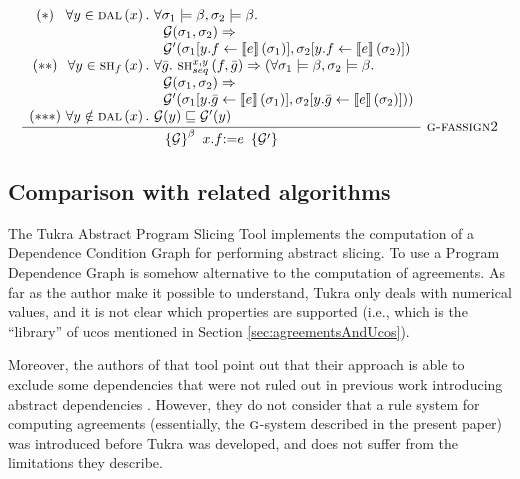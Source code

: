 \documentclass[prodmode,acmtocl]{acmsmall}
\def\state{\ensuremath{\sigma}\xspace}
\newcommand{\0}{\mbox{\bf 0}}
\newcommand{\CODE}[1]{\ensuremath{\mbox{\lstinline!#1!}\xspace}\xspace}
\newcommand{\SEMANTICS}[1]{\left\llbracket #1 \right\rrbracket}
\def\PRED{\beta}
\def\AGREEM{\mathcal{G}}
\newcommand{\RULENAME}[1]{\textsc{#1}}
\newcommand{\GRULENAME}[1]{\textsc{g-#1}}
\newcommand{\GRULE}[3]{\frac{#1}{#2}\ \GRULENAME{#3}}
\newcommand{\GSMTH}[1]{$\RULENAME{g}$-#1}
\def\GSYSTEM{\GSMTH{system}\xspace}
\newcommand{\SEQSHARE}[4]{\textsc{sh}_{seq}^{#3,#4}\left(#1,#2\right)}
\newcommand{\TRIPLEB}[4]{\left\{#1\right\}^{#2}\ #3\ \left\{#4\right\}}
\newcommand{\DALIAS}[1]{\textsc{dal}\left(#1\right)}
\newcommand{\FSHARE}[2]{\textsc{sh}_{#1}\left(#2\right)}
\begin{document}
\[
\GRULE{
  \begin{array}{c@{~}r@{~}l}
    ({*}) & \forall y \in \DALIAS{x}. & \forall
    \state_1 \models \PRED,\state_2 \models
    \PRED. \\ 
    & & ~~\AGREEM(\state_1,\state_2)
    \Rightarrow \\
    & & ~~\AGREEM'(\state_1[y.f \leftarrow
      \SEMANTICS{e}(\state_1)],\state_2[y.f \leftarrow
      \SEMANTICS{e}(\state_2)]) \\
    ({*}{*}) & \forall y \in \FSHARE{f}{x}. &
    \forall \bar{g}.~\SEQSHARE{f}{\bar{g}}{x}{y} \Rightarrow
    (\forall
    \state_1 \models \PRED,\state_2 \models
    \PRED. \\
    & & ~~\AGREEM(\state_1,\state_2)
    \Rightarrow \\
    & & ~~\AGREEM'(\state_1[y.\bar{g} \leftarrow
      \SEMANTICS{e}(\state_1)],\state_2[y.\bar{g} \leftarrow
      \SEMANTICS{e}(\state_2)])) \\
    ({*}{*}{*}) & \forall y \notin \DALIAS{x}. & \AGREEM(y)
    \sqsubseteq \AGREEM'(y)
  \end{array}
}{
  \TRIPLEB{\AGREEM}{\PRED}{x.f\mbox{\CODE{:=}}e}{\AGREEM'}
}{fassign2}
\]

\subsection{Comparison with related algorithms}
\label{sec:comparisonWithRelatedAlgorithms}

The Tukra Abstract Program Slicing Tool
\cite{DBLP:conf/icsoft/HalderC12} implements the computation of a
Dependence Condition Graph \cite{DBLP:journals/scp/HalderC13} for
performing abstract slicing.  To use a Program Dependence Graph is
somehow alternative to the computation of agreements.  As far as the
author make it possible to understand, Tukra only deals with numerical
values, and it is not clear which properties are supported (i.e.,
which is the ``library'' of ucos mentioned in Section
\ref{sec:agreementsAndUcos}).

Moreover, the authors of that tool point out that their approach is
able to exclude some dependencies that were not ruled out in previous
work introducing abstract dependencies \cite{MastroeniZanardini}.
However, they do not consider that a rule system for computing
agreements (essentially, the \GSYSTEM described in the present paper)
was introduced \cite{Zanardini} before Tukra was developed, and does
not suffer from the limitations they describe.
\end{document}
